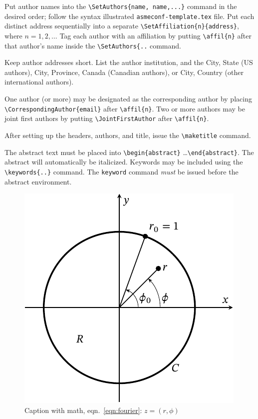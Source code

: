\documentclass[grid,balance,upint,subscriptcorrection,varvw,mathalfa=cal=euler,spanish,french,greek,russian,vietnamese,colorlinks]{asmeconf}
\begin{document}
Put author names into the \verb|\SetAuthors{name, name,...}| command in the desired order; follow the syntax illustrated \texttt{asmeconf-template.tex} file. Put each distinct address sequentially into a separate \verb|\SetAffiliation{n}{address}|, where $n = 1,2,\ldots$ Tag each author with an affiliation by putting \verb|\affil{n}| after that author's name inside the \verb|\SetAuthors{..| command. 

Keep author addresses short.  List the author institution, and the City, State (US authors), City, Province, Canada (Canadian authors), or City, Country (other international authors). 

One author (or more) may be designated as the corresponding author by placing \verb|\CorrespondingAuthor{email}|  after \verb|\affil{n}|. Two or more authors may be joint first authors by putting \verb|\JointFirstAuthor| after \verb|\affil{n}|.

After setting up the headers, authors,  and title, issue the \verb|\maketitle| command. 

The abstract text must be placed into \verb|\begin{abstract}| \ldots \verb|\end{abstract}|. The abstract will automatically be italicized. Keywords may be included using the \verb|\keywords{..}| command. The \texttt{keyword} command \textit{must} be issued before the abstract environment. 




\begin{figure}
\centering\includegraphics[width=0.7\linewidth]{sample-figure-1.pdf}
\caption{Caption with math, eqn.~\eqref{eqn:fourier}: $z = (r,\phi)$ \cite{Lienhard2019b}\label{fig:1}}
\end{figure}
 
\end{document}
